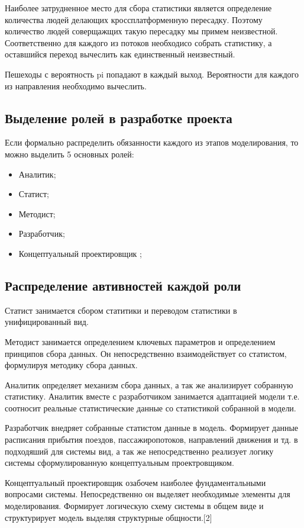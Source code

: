 \documentclass[12pt]{article}
\begin{document}
		Наиболее затрудненное место для сбора статистики является определение количества людей делающих кроссплатформенную пересадку. Поэтому количество людей соверщажщих такую пересадку мы примем неизвестной. Соответственно для каждого из потоков необходисо собрать статистику, а оставшийся переход вычеслить как единственный неизвестный.
		
		  Пешеходы с вероятность pi  попадают в каждый выход.  Вероятности для каждого из направления необходимо вычеслить.

		\subsection{Выделение ролей в разработке проекта }
		
Если формально распределить обязанности каждого из этапов моделирования, то можно выделить 5 основных ролей:		
	\begin{itemize}
		\item Аналитик;
		\item Статист;
		\item Методист;
		\item Разработчик;
		\item Концептуальный проектировщик ;
	\end{itemize}	
	
		\subsection{Распределение автивностей каждой роли}

Статист занимается сбором статитики и переводом статистики в унифицированный вид. 

Методист занимается определением ключевых параметров и определением принципов сбора данных. Он непосредственно взаимодействует со статистом, формулируя методику сбора данных.

Аналитик определяет механизм сбора данных, а так же анализирует собранную статистику. Аналитик вместе с разработчиком занимается адаптацией модели т.е. соотносит реальные статистические данные со статистикой собранной в модели.

Разработчик внедряет собранные статистом данные в модель. Формирует данные расписания прибытия поездов, пассажиропотоков, направлений движения и тд. в подходяший для системы вид, а так же непосредственно реализует логику системы сформулированную концептуальным проектровщиком.

 Концептуальный проектировщик озабочем наиболее фундаментальными вопросами системы. Непосредственно он выделяет необходимые элементы для моделирования.  Формирует логическую схему системы в общем виде и структурирует модель выделяя структурные общности.[2]
\end{document}

